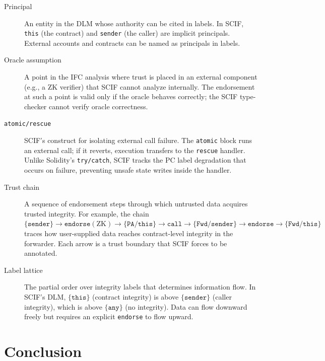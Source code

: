 \documentclass[11pt,a4paper]{article}
\begin{document}
\begin{description}
  \item[Principal] An entity in the DLM whose authority can be cited in labels.
    In SCIF, \texttt{this} (the contract) and \texttt{sender} (the caller) are
    implicit principals. External accounts and contracts can be named as
    principals in labels.

  \item[Oracle assumption] A point in the IFC analysis where trust is placed in
    an external component (e.g., a ZK verifier) that SCIF cannot analyze
    internally. The endorsement at such a point is valid only if the oracle
    behaves correctly; the SCIF type-checker cannot verify oracle correctness.

  \item[\texttt{atomic/rescue}] SCIF's construct for isolating external call
    failure. The \texttt{atomic} block runs an external call; if it reverts,
    execution transfers to the \texttt{rescue} handler. Unlike Solidity's
    \texttt{try/catch}, SCIF tracks the PC label degradation that occurs on
    failure, preventing unsafe state writes inside the handler.

  \item[Trust chain] A sequence of endorsement steps through which untrusted
    data acquires trusted integrity. For example, the chain
    $\{\texttt{sender}\} \to \texttt{endorse}(\text{ZK}) \to
    \{\texttt{PA/this}\} \to \texttt{call} \to \{\texttt{Fwd/sender}\} \to
    \texttt{endorse} \to \{\texttt{Fwd/this}\}$ traces how user-supplied data
    reaches contract-level integrity in the forwarder. Each arrow is a trust
    boundary that SCIF forces to be annotated.

  \item[Label lattice] The partial order over integrity labels that determines
    information flow. In SCIF's DLM, $\{\texttt{this}\}$ (contract integrity) is
    above $\{\texttt{sender}\}$ (caller integrity), which is above
    $\{\texttt{any}\}$ (no integrity). Data can flow downward freely but
    requires an explicit \texttt{endorse} to flow upward.
\end{description}

\section{Conclusion}
\label{sec:conclusion}
\end{document}
